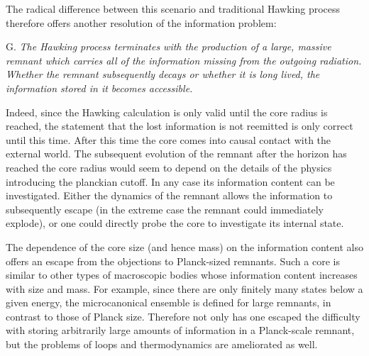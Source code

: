 The radical difference between this scenario and traditional Hawking
process therefore
offers another resolution of the information problem:

\item{G.} {\it The Hawking process terminates with the production of a
large, massive remnant which carries all of the  information
missing from the outgoing radiation.  Whether the remnant subsequently
decays or whether it is long lived, the information stored in it becomes
accessible.}

Indeed,
since the
Hawking calculation is only valid until the core radius is reached,
the statement that the lost information is not reemitted is only
correct until this time.  After this time the core comes into causal
contact with the external world.  The subsequent evolution
of the remnant after the horizon has reached
the core radius would seem to depend on the details of the physics
introducing the planckian cutoff.  In any case its information
content can be investigated.  Either the dynamics of the remnant allows
the information to subsequently escape (in the extreme case the remnant
could immediately explode), or one could
directly probe the core to investigate its internal state.

The dependence of the core size (and hence mass) on the information
content also offers an escape from the objections to Planck-sized
remnants.  Such a core is similar to other types of macroscopic bodies
whose information content increases with size and mass.  For example,
since there are only finitely many states below a given
energy, the microcanonical ensemble is defined for large remnants, in
contrast to those of Planck size.
Therefore not only has one escaped the difficulty
with storing arbitrarily large amounts of information in a Planck-scale
remnant, but the problems of loops and thermodynamics are ameliorated as
well.
%

